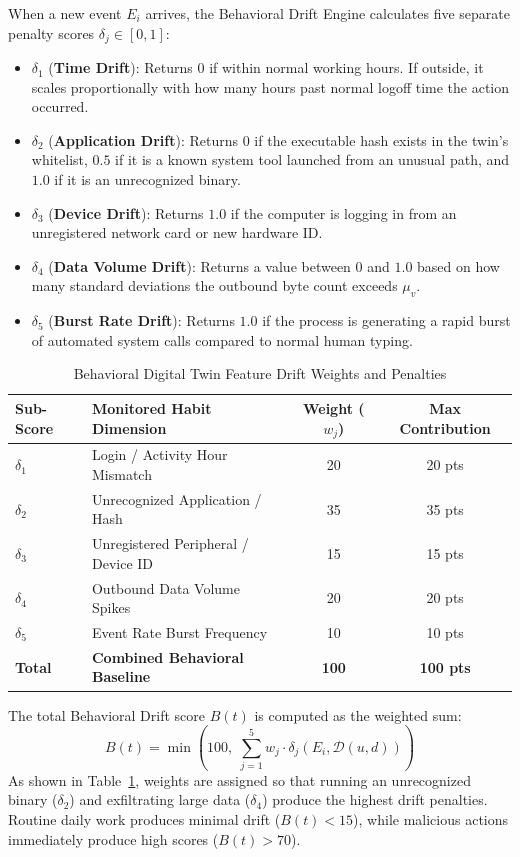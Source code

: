 \documentclass[conference]{IEEEtran}
\begin{document}
When a new event $E_i$ arrives, the Behavioral Drift Engine calculates five separate penalty scores $\delta_j \in [0, 1]$:
\begin{itemize}
    \item $\delta_1$ (\textbf{Time Drift}): Returns $0$ if within normal working hours. If outside, it scales proportionally with how many hours past normal logoff time the action occurred.
    \item $\delta_2$ (\textbf{Application Drift}): Returns $0$ if the executable hash exists in the twin's whitelist, $0.5$ if it is a known system tool launched from an unusual path, and $1.0$ if it is an unrecognized binary.
    \item $\delta_3$ (\textbf{Device Drift}): Returns $1.0$ if the computer is logging in from an unregistered network card or new hardware ID.
    \item $\delta_4$ (\textbf{Data Volume Drift}): Returns a value between $0$ and $1.0$ based on how many standard deviations the outbound byte count exceeds $\mu_v$.
    \item $\delta_5$ (\textbf{Burst Rate Drift}): Returns $1.0$ if the process is generating a rapid burst of automated system calls compared to normal human typing.
\end{itemize}

\begin{table}[h]
\caption{Behavioral Digital Twin Feature Drift Weights and Penalties}
\label{tab:twin_weights}
\centering
\begin{tabular}{@{}llcc@{}}
\toprule
\textbf{Sub-Score} & \textbf{Monitored Habit Dimension} & \textbf{Weight ($w_j$)} & \textbf{Max Contribution} \\
\midrule
$\delta_1$ & Login / Activity Hour Mismatch & 20 & 20 pts \\
$\delta_2$ & Unrecognized Application / Hash & 35 & 35 pts \\
$\delta_3$ & Unregistered Peripheral / Device ID & 15 & 15 pts \\
$\delta_4$ & Outbound Data Volume Spikes & 20 & 20 pts \\
$\delta_5$ & Event Rate Burst Frequency & 10 & 10 pts \\
\midrule
\textbf{Total} & \textbf{Combined Behavioral Baseline} & \textbf{100} & \textbf{100 pts} \\
\bottomrule
\end{tabular}
\end{table}

The total Behavioral Drift score $B(t)$ is computed as the weighted sum:
\begin{equation}
B(t) = \min\left(100, \; \sum_{j=1}^5 w_j \cdot \delta_j(E_i, \mathcal{D}(u, d))\right)
\end{equation}
As shown in Table~\ref{tab:twin_weights}, weights are assigned so that running an unrecognized binary ($\delta_2$) and exfiltrating large data ($\delta_4$) produce the highest drift penalties. Routine daily work produces minimal drift ($B(t) < 15$), while malicious actions immediately produce high scores ($B(t) > 70$).
\end{document}
